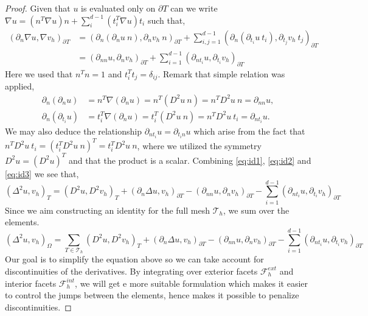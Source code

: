 \documentclass[11pt]{article}
\theoremstyle{remark}
\numberwithin{equation}{section}
\begin{document}
\begin{proof}
Given that $u$ is evaluated only on $\partial T$ can we write
$\nabla u = \left( n^{T} \nabla u   \right) n + \sum_i^{d-1} \left( t_i^{T} \nabla u   \right) t_i$ such that,
\begin{equation}
\label{eq:id3}
    \begin{split}
(  \partial_n\nabla u, \nabla v_h ) _{\partial_{} T  } & =  ( \partial _{n} ( \partial_{n}u \ n), \partial _{n} v_h \ n )_{\partial T}   +\sum_{i,j=1}^{d-1} ( \partial _{n} ( \partial_{t_{i}}u \ t_{i}), \partial _{t_{j}} v_h \ t_{j} )_{\partial T} \\
& =  ( \partial _{nn} u, \partial _{n} v_h  )_{\partial T}+\sum_{i=1}^{d-1} ( \partial _{n t_{i}}u , \partial _{t_{i}} v_h  )_{\partial T}
    \end{split}
\end{equation}
Here we used that $n^{T} n = 1$ and $t_{i}^{T} t_{j} = \delta_{ij}$.
Remark that simple relation was applied,
    \begin{align*}
\partial_n (\partial_n u)  & = n^T \nabla (\partial_n u)  = n ^T (D^2 u \ n)  = n^{T} D^2 u \ n = \partial _{nn} u, \\
\partial_n (\partial_{t_{i}} u)  & = t_{i}^T \nabla (\partial_n u)  = t_i^T (D^2 u \ n )   = n^{T} D^2 u \ t_{i} = \partial _{n t_{i}} u.
    \end{align*}
We may also deduce the relationship $\partial _{nt_{i}} u = \partial _{t_{i}n}u$ which arise from the fact that $n^{T} D^2u \ t_{i} = ( t_{i}^{T} D^2u \  n)^T = t_{i}^{T}  D^2u \  n$, where we utilized the symmetry $D^2u = ( D^2u) ^{T} $ and that the
product is a scalar.
Combining \eqref{eq:id1}, \eqref{eq:id2} and \eqref{eq:id3} we see that,
\[
    ( \Delta ^2 u, v_h) _{T}   = ( D^2 u, D^2v_h)_{T } + ( \partial _{n}  \Delta u, v_h )_{\partial T} -( \partial _{nn}u , \partial _{n} v_h  )_{\partial T}-\sum_{i=1}^{d-1} ( \partial _{n t_{i}}u, \partial _{t_{i}} v_h  )_{\partial T}
\]
Since we aim constructing an identity for the full mesh $\mathcal{T} _{h}$, we sum over the elements.
\begin{equation}
\label{eq:bi_basic_dg2}
\left( \Delta  ^{2} u,v_h \right) _{\Omega } = \sum_{T \in  \mathcal{T} _{h}}^{}  ( D^2 u, D^2v_h)_{T } + ( \partial _{n}  \Delta u, v_h )_{\partial T} -( \partial _{nn}u , \partial _{n} v_h  )_{\partial T}-\sum_{i=1}^{d-1} ( \partial _{n t_{i}} u , \partial _{t_{i}} v_h  )_{\partial T}
\end{equation}
Our goal is to simplify the equation above so we can take account for discontinuities of the derivatives.
By integrating over exterior facets $\mathcal{F} _{h}^{ext}$ and interior facets $\mathcal{F} _{h}^{int}$, we will get e more suitable formulation which makes it easier to control the jumps between the elements, hence makes it possible to penalize discontinuities.


\end{proof}
\end{document}
